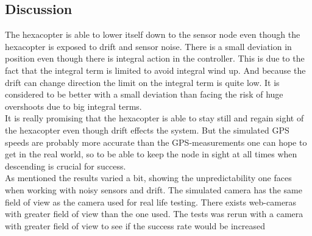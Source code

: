 \subsection{Discussion}
The hexacopter is able to lower itself down to the sensor node even though the hexacopter is exposed to drift and sensor noise. There is a small deviation in position even though there is integral action in the controller. This is due to the fact that the integral term is limited to avoid integral wind up. And because the drift can change direction the limit on the integral term is quite low. It is considered to be better with a small deviation than facing the risk of huge overshoots due to big integral terms.\\
\newline
It is really promising that the hexacopter is able to stay still and regain sight of the hexacopter even though drift effects the system. But the simulated GPS speeds are probably more accurate than the GPS-measurements one can hope to get in the real world, so to be able to keep the node in sight at all times when descending is crucial for success.\\
\newline
As mentioned the results varied a bit, showing the unpredictability one faces when working with noisy sensors and drift. The simulated camera has the same field of view as the camera used for real life testing. There exists web-cameras with greater field of view than the one used. The tests was rerun with a camera with greater field of view to see if the success rate would be increased